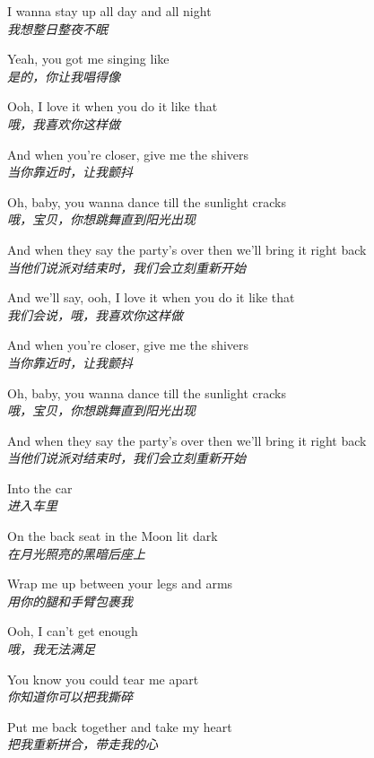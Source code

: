 \begin{spacing}{1.5}
\begin{flushleft}
I wanna stay up all day and all night\\
\textit{我想整日整夜不眠}\lyricspace

Yeah, you got me singing like\\
\textit{是的，你让我唱得像}\lyricspace

Ooh, I love it when you do it like that\\
\textit{哦，我喜欢你这样做}\lyricspace

And when you're closer, give me the shivers\\
\textit{当你靠近时，让我颤抖}\lyricspace

Oh, baby, you wanna dance till the sunlight cracks\\
\textit{哦，宝贝，你想跳舞直到阳光出现}\lyricspace

And when they say the party's over then we'll bring it right back\\
\textit{当他们说派对结束时，我们会立刻重新开始}\lyricspace

And we'll say, ooh, I love it when you do it like that\\
\textit{我们会说，哦，我喜欢你这样做}\lyricspace

And when you're closer, give me the shivers\\
\textit{当你靠近时，让我颤抖}\lyricspace

Oh, baby, you wanna dance till the sunlight cracks\\
\textit{哦，宝贝，你想跳舞直到阳光出现}\lyricspace

And when they say the party's over then we'll bring it right back\\
\textit{当他们说派对结束时，我们会立刻重新开始}\lyricspace

Into the car\\
\textit{进入车里}\lyricspace

On the back seat in the Moon lit dark\\
\textit{在月光照亮的黑暗后座上}\lyricspace

Wrap me up between your legs and arms\\
\textit{用你的腿和手臂包裹我}\lyricspace

Ooh, I can't get enough\\
\textit{哦，我无法满足}\lyricspace

You know you could tear me apart\\
\textit{你知道你可以把我撕碎}\lyricspace

Put me back together and take my heart\\
\textit{把我重新拼合，带走我的心}\lyricspace


\end{flushleft}
\end{spacing}
